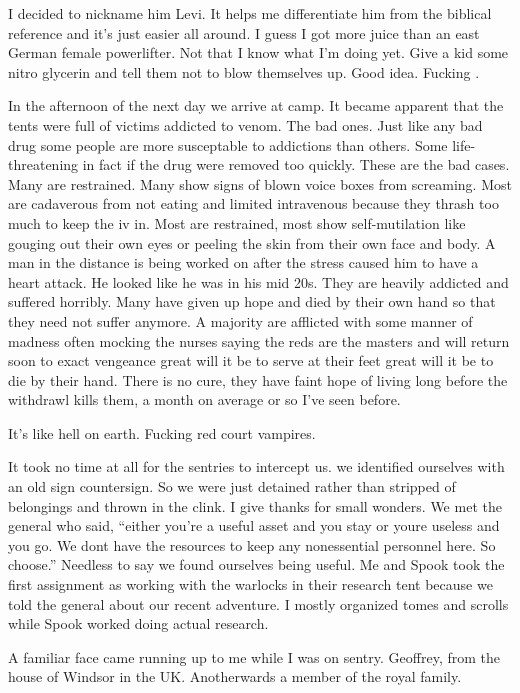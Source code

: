 I decided to nickname him Levi. It helps me differentiate him from the biblical reference and it's just easier all around. I guess I got more juice than an east German female powerlifter. Not that I know what I'm doing yet. Give a kid some nitro glycerin and tell them not to blow themselves up. Good idea. Fucking \chichenitza*.

\parasep
In the afternoon of the next day we arrive at camp. It became apparent that the tents were full of victims addicted to venom. The bad ones. Just like any bad drug some people are more susceptable to addictions than others. Some life-threatening in fact if the drug were removed too quickly. These are the bad cases. Many are restrained. Many show signs of blown voice boxes from screaming. Most are cadaverous from not eating and limited intravenous because they thrash too much to keep the iv in. Most are restrained, most show self-mutilation like gouging out their own eyes or peeling the skin from their own face and body. A man in the distance is being worked on after the stress caused him to have a heart attack. He looked like he was in his mid 20s. They are heavily addicted and suffered horribly. Many have given up hope and died by their own hand so that they need not suffer anymore. A majority are afflicted with some manner of madness often mocking the nurses saying the reds are the masters and will return soon to exact vengeance great will it be to serve at their feet great will it be to die by their hand. There is no cure, they have faint hope of living long before the withdrawl kills them, a month on average or so I've seen before. 

It's like hell on earth. Fucking red court vampires.

It took no time at all for the sentries to intercept us. we identified ourselves with an old sign countersign. So we were just detained rather than stripped of belongings and thrown in the clink. I give thanks for small wonders. We met the general who said, ``either you're a useful asset and you stay or youre useless and you go. We dont have the resources to keep any nonessential personnel here. So choose.'' Needless to say we found ourselves being useful. Me and Spook took the first assignment as working with the warlocks in their research tent because we told the general about our recent adventure. I mostly organized tomes and scrolls while Spook worked doing actual research.

\parasep

A familiar face came running up to me while I was on sentry. Geoffrey, from the house of Windsor in the UK. Anotherwards a member of the royal family.

